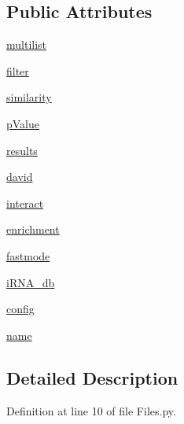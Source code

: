 \subsection*{\-Public \-Attributes}
\begin{DoxyCompactItemize}
\item 
\hyperlink{classirna_1_1David2tulip_1_1Files_1_1Files_a82b79831478f94e2614bf2fde287d4ec}{multilist}
\item 
\hyperlink{classirna_1_1David2tulip_1_1Files_1_1Files_afba29f71e2f9fc83060e02b16f75161e}{filter}
\item 
\hyperlink{classirna_1_1David2tulip_1_1Files_1_1Files_af626bb7a4f93447d7b85220ba5e4c03b}{similarity}
\item 
\hyperlink{classirna_1_1David2tulip_1_1Files_1_1Files_a7bd9971105e4c021354903d5ea07d1a6}{p\-Value}
\item 
\hyperlink{classirna_1_1David2tulip_1_1Files_1_1Files_a3d3b97a7d6e21920994ce83fb1840022}{results}
\item 
\hyperlink{classirna_1_1David2tulip_1_1Files_1_1Files_a72498b72041166db036085acd589ea72}{david}
\item 
\hyperlink{classirna_1_1David2tulip_1_1Files_1_1Files_abbd004852ce8d9ab8e288f302a2438bd}{interact}
\item 
\hyperlink{classirna_1_1David2tulip_1_1Files_1_1Files_a4d7ed0b154c09e07c892e96416686669}{enrichment}
\item 
\hyperlink{classirna_1_1David2tulip_1_1Files_1_1Files_a9d20be557f0cec30ab1b6b20463ca549}{fastmode}
\item 
\hyperlink{classirna_1_1David2tulip_1_1Files_1_1Files_a6f550e6c30f3135b3436c14dc9798a05}{i\-R\-N\-A\-\_\-db}
\item 
\hyperlink{classirna_1_1David2tulip_1_1Files_1_1Files_af8e4701025ec14d10affa3ce9a714a06}{config}
\item 
\hyperlink{classirna_1_1David2tulip_1_1Files_1_1Files_a8fa4549f8acbdc6ef286e8312a2a4447}{name}
\end{DoxyCompactItemize}


\subsection{\-Detailed \-Description}


\-Definition at line 10 of file \-Files.\-py.



